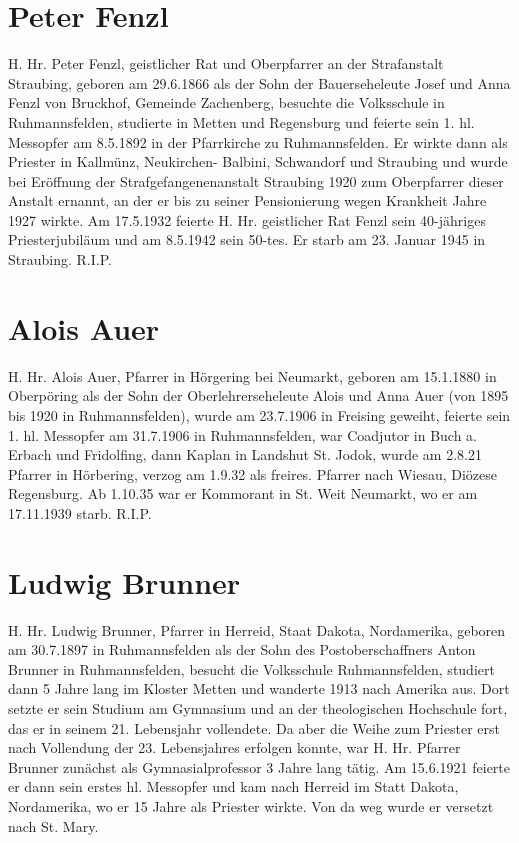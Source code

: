 \documentclass[12pt,a4paper]{book}
\begin{document}
\section{Peter Fenzl}

H. Hr. Peter Fenzl, geistlicher Rat und Oberpfarrer an der Strafanstalt
Straubing, geboren am 29.6.1866 als der Sohn der Bauerseheleute Josef
und Anna Fenzl von Bruckhof, Gemeinde Zachenberg, besuchte die
Volksschule in Ruhmannsfelden, studierte in Metten und Regensburg und
feierte sein 1. hl. Messopfer am 8.5.1892 in der Pfarrkirche zu
Ruhmannsfelden. Er wirkte dann als Priester in Kallmünz, Neukirchen-
Balbini, Schwandorf und Straubing und wurde bei Eröffnung der
Strafgefangenenanstalt Straubing 1920 zum Oberpfarrer dieser Anstalt
ernannt, an der er bis zu seiner Pensionierung wegen Krankheit Jahre
1927 wirkte. Am 17.5.1932 feierte H. Hr. geistlicher Rat Fenzl sein
40-jähriges Priesterjubiläum und am 8.5.1942 sein 50-tes. Er starb am
23. Januar 1945 in Straubing. R.I.P.

\section{Alois Auer}

H. Hr. Alois Auer, Pfarrer in Hörgering bei Neumarkt, geboren am
15.1.1880 in Oberpöring als der Sohn der Oberlehrerseheleute Alois
und Anna Auer (von 1895 bis 1920 in Ruhmannsfelden), wurde am
23.7.1906 in Freising geweiht, feierte sein 1. hl. Messopfer am
31.7.1906 in Ruhmannsfelden, war Coadjutor in Buch a. Erbach und
Fridolfing, dann Kaplan in Landshut St. Jodok, wurde am 2.8.21
Pfarrer in Hörbering, verzog am 1.9.32 als freires. Pfarrer nach
Wiesau, Diözese Regensburg. Ab 1.10.35 war er Kommorant in St. Weit
Neumarkt, wo er am 17.11.1939 starb. R.I.P.

\section{Ludwig Brunner}

H. Hr. Ludwig Brunner, Pfarrer in Herreid, Staat Dakota, Nordamerika,
geboren am 30.7.1897 in Ruhmannsfelden als der Sohn des
Postoberschaffners Anton Brunner in Ruhmannsfelden, besucht die
Volksschule Ruhmannsfelden, studiert dann 5 Jahre lang im Kloster
Metten und wanderte 1913 nach Amerika aus. Dort setzte er sein
Studium am Gymnasium und an der theologischen Hochschule fort, das er
in seinem 21. Lebensjahr vollendete. Da aber die Weihe zum Priester
erst nach Vollendung der 23. Lebensjahres erfolgen konnte, war H. Hr.
Pfarrer Brunner zunächst als Gymnasialprofessor 3 Jahre lang tätig.
Am 15.6.1921 feierte er dann sein erstes hl. Messopfer und kam nach
Herreid im Statt Dakota, Nordamerika, wo er 15 Jahre als Priester
wirkte. Von da weg wurde er versetzt nach St. Mary.
\end{document}
